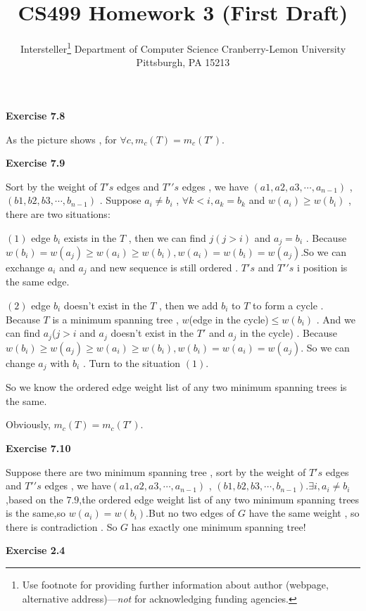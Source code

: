 \documentclass{article} %
\title{CS499 Homework 3 (First Draft)}
\author{
	Intersteller\thanks{ Use footnote for providing further information
		about author (webpage, alternative address)---\emph{not} for acknowledging
		funding agencies.}
	Department of Computer Science
	Cranberry-Lemon University
	Pittsburgh, PA 15213
}
\begin{document}
	
	
	\maketitle
	
	
	\textbf{Exercise 7.8}\par
    As the picture shows , for $\forall c,m_c(T)=m_c(T\prime)$.

  

	\textbf{Exercise 7.9}\par
    Sort by the weight of $T's$ edges and $T\prime's$ edges , we have $(a1,a2,a3,\cdots,a_{n-1})$ , $(b1,b2,b3,\cdots,b_{n-1})$ . Suppose $a_i\ne b_i$ , $\forall k<i,a_k=b_k$ and $w(a_i)\geq w(b_i)$ , there are two situations:\par
    $(1)$ edge $b_i$ exists in the $T$ , then we can find $j(j>i)$ and $a_j=b_i$ . Because $w(b_i)=w(a_j)\geq w(a_i)\geq w(b_i) , w(a_i)=w(b_i)=w(a_j) . $So we can exchange $a_i$ and $a_j$ and new sequence is still ordered . $T's$ and $T\prime's$ i position is the same edge.\par
    $(2)$ edge $b_i$ doesn't exist in the $T$ , then we add $b_i$ to $T$ to form a cycle . Because $T$ is a minimum spanning tree , $w$(edge in the cycle)$\leq w(b_i)$ . And we can find $a_j$($j>i$ and $a_j$ doesn't exist in the $T\prime$ and $a_j$ in the cycle) . Because $w(b_i)\geq w(a_j)\geq w(a_i) \geq w(b_i),w(b_i)=w(a_i)=w(a_j).$ So we can change $a_j$ with $b_i$ . Turn to the situation $(1)$.\par
    So we know the ordered edge weight list of any two minimum spanning trees is the same.\par
    Obviously, $m_c(T)=m_c(T\prime).$

	
	\textbf{Exercise 7.10}\par
	Suppose there are two minimum spanning tree , sort by the weight of $T's$ edges and $T\prime's$ edges , we have$(a1,a2,a3,\cdots,a_{n-1})$ , $(b1,b2,b3,\cdots,b_{n-1})$.$\exists i,a_i \ne b_i$,based on the $7.9$,the ordered edge weight list of any two minimum spanning trees is the same,so $w(a_i)=w(b_i)$.But no two edges of $G$ have the same weight , so there is contradiction . So $G$ has exactly one minimum spanning tree!





	\textbf{Exercise 2.4}\par
	
\end{document}
